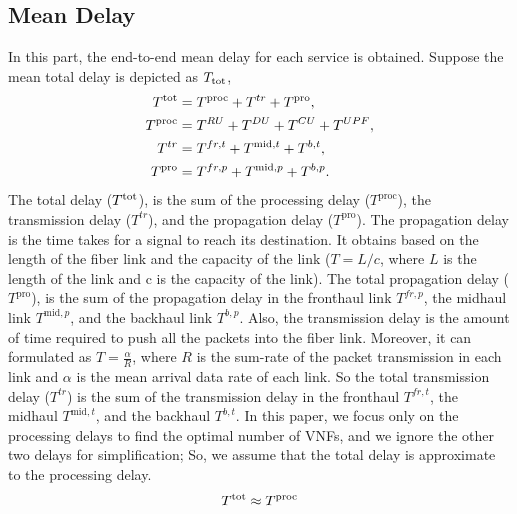 \documentclass{article}
\begin{document}
\subsection{Mean Delay}
In this part, the end-to-end mean delay for each service is obtained.
Suppose the mean total delay is depicted as $T_{\text{\text{tot}}}$,
\begin{equation}
\begin{split}
T^{\text{\text{tot}}} &=  T^{\text{proc}} + T^{tr} + T^{\text{pro}},\\
T^{\text{\text{proc}}} &=  T^{RU} + T^{DU} + T^{CU} + T^{UPF},\\
T^{tr} &= T^{fr,t} + T^{\text{mid},t} + T^{b,t},  \\
T^{\text{pro}} &= T^{fr,p} + T^{\text{mid},p} + T^{b,p}.  \\
\end{split}
\end{equation}
The total delay ($T^{\text{\text{tot}}}$), is the sum of the processing delay ($T^{\text{proc}}$), the transmission delay ($T^{tr}$), and the propagation delay ($T^{\text{pro}}$). 
The propagation delay is the time takes for a signal to reach its destination. It obtains based on the length of the fiber link and the capacity of the link ($T = L/c$, where $L$ is the length of the link and c is the capacity of the link). The total propagation delay ($T^{\text{pro}}$), is the sum of the propagation delay in the fronthaul link $T^{fr,p}$, the midhaul link $T^{\text{mid},p}$, and the backhaul link $T^{b,p}$.
Also, the transmission delay is the amount of time required to push all the packets into the fiber link.
Moreover, it can formulated as 
$T = \frac{\mathcal{\alpha}}{R}$, where $R$ is the sum-rate of the packet transmission in each link and $\mathcal{\alpha}$ is the mean arrival data rate of each link.
So the total transmission delay ($T^{tr}$) is the sum of the transmission delay in the fronthaul $T^{fr,t}$, the midhaul $T^{\text{mid},t}$, and the backhaul $T^{b,t}$.
In this paper, we focus only on the processing delays to find the optimal number of VNFs, and we ignore the other two delays for simplification;
So, we assume that the total delay is approximate to the processing delay.
\begin{equation}
T^{\text{\text{tot}}} \approx T^{\text{proc}}
\end{equation}
\end{document}
